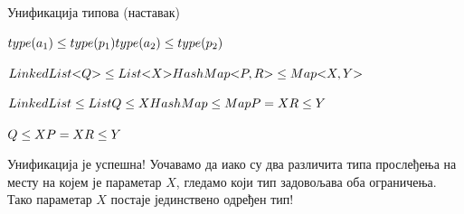 \documentclass[xcolor=table]{beamer}
\begin{document}
\begin{frame}[allowframebreaks]{Унификација типова (наставак)}
        \framebreak
        
        \begin{math}
type(a_1) \leq type(p_1)
\newline
type(a_2) \leq type(p_2)
\newline
        \end{math}
        
        \framebreak
        
        \begin{math}
LinkedList\mathord{<}Q\mathord{>} \leq List\mathord{<}X\mathord{>}
\newline
HashMap\mathord{<}P, R\mathord{>} \leq Map\mathord{<}X, Y\mathord{>}
        \end{math}
        
        \framebreak
        
        \begin{math}
LinkedList \leq List
\newline
Q \leq X
\newline
HashMap \leq Map
\newline
P = X
\newline
R \leq Y
\newline
        \end{math}
        
        \framebreak
        
        \begin{math}
Q \leq X
\newline
P = X
\newline
R \leq Y
\newline
        \end{math}
        
        Унификација је успешна!
        \newline\newline
        Уочавамо да иако су два различита типа прослеђења на месту на којем је параметар \begin{math}X\end{math}, гледамо који тип задовољава оба ограничења.
        \newline\newline
        Тако параметар \begin{math}X\end{math} постаје јединствено одређен тип!
    \end{frame}
    
\end{document}
